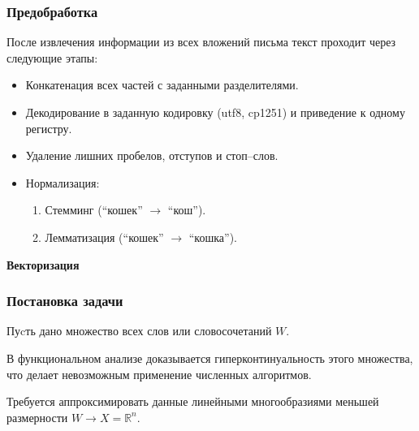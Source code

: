\documentclass[compress,professionalfont]{beamer}
\begin{document}
\begin{frame}
\frametitle{Предобработка}

После извлечения информации из всех вложений письма текст проходит через следующие этапы:
\begin{itemize}
\item Конкатенация всех частей с заданными разделителями.
\item Декодирование в заданную кодировку (utf8, cp1251) и приведение к одному регистру.
\item Удаление лишних пробелов, отступов и стоп--слов.
\item Нормализация:
\begin{enumerate}
\item Стемминг (``кошек'' $\rightarrow$ ``кош'').
\item Лемматизация (``кошек'' $\rightarrow$ ``кошка'').
\end{enumerate}
\end{itemize}

\end{frame}

\begin{frame}

\begin{center}
\Huge\bf Векторизация
\end{center}

\end{frame}

\begin{frame}
\frametitle{Постановка задачи}

Пуcть дано множество всех слов или словосочетаний $W$.

В функциональном анализе доказывается гиперконтинуальность этого множества, что делает невозможным применение численных алгоритмов.

Требуется аппроксимировать данные линейными многообразиями меньшей размерности $W \rightarrow X = \mathbb{R}^n.$

\end{frame}
\end{document}
